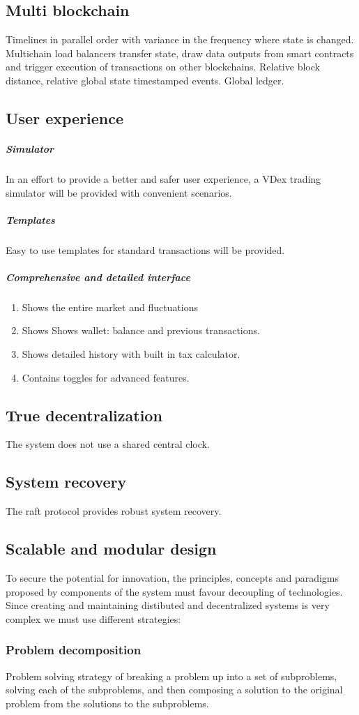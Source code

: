 \documentclass[]{article}
\begin{document}
	\subsection{Multi blockchain}
	Timelines in parallel order with variance in the frequency where state is changed.
	Multichain load balancers transfer state, draw data outputs from smart contracts and 
	trigger execution of transactions on other blockchains. 
	Relative block distance, relative global state timestamped events.
	Global ledger.
		
	\subsection{User experience}
	\subparagraph{Simulator}
	In an effort to provide a better and safer user experience, 
	a VDex trading simulator will be provided with convenient scenarios.
	\subparagraph{Templates}
	Easy to use templates for standard transactions will be provided.
	\subparagraph{Comprehensive and detailed interface}
	\begin{enumerate}
		\item Shows the entire market and fluctuations
		\item Shows Shows wallet: balance and previous transactions.
		\item Shows detailed history with built in tax calculator.
		\item Contains toggles for advanced features.		 
	\end{enumerate}
	
	\subsection{True decentralization}
	The system does not use a shared central clock.
	\subsection{System recovery}
	The raft protocol provides robust system recovery.

	\subsection{Scalable and modular design}
	To secure the potential for innovation, the principles, 
	concepts and paradigms proposed by components of the system
	must favour decoupling of technologies. 
	Since creating and maintaining distibuted and decentralized systems
	is very complex we must use different strategies: 
	\subsubsection{Problem decomposition}
	Problem solving strategy of breaking a problem up into a set of subproblems, solving each of the subproblems, and then composing a solution to the original problem from the solutions to the subproblems.
\end{document}
